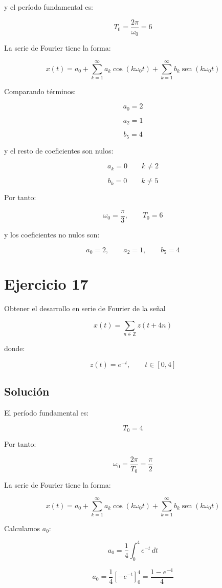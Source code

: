 \documentclass[fleqn]{article}
\DeclareMathOperator{\sen}{sen}
\begin{document}
	y el período fundamental es:

	\[
	T_0
	=
	\frac{2\pi}{\omega_0}
	=
	6
	\]

	La serie de Fourier tiene la forma:

	\[
	x(t)
	=
	a_0
	+
	\sum_{k=1}^{\infty}
	a_k\cos(k\omega_0t)
	+
	\sum_{k=1}^{\infty}
	b_k\sen(k\omega_0t)
	\]

	Comparando términos:

	\[
	a_0=2
	\]

	\[
	a_2=1
	\]

	\[
	b_5=4
	\]

	y el resto de coeficientes son nulos:

	\[
	a_k=0
	\qquad
	k\neq2
	\]

	\[
	b_k=0
	\qquad
	k\neq5
	\]

	Por tanto:

	\[
	\boxed{
	\omega_0=\frac{\pi}{3},
	\qquad
	T_0=6
	}
	\]

	y los coeficientes no nulos son:

	\[
	\boxed{
	a_0=2,\qquad
	a_2=1,\qquad
	b_5=4
	}
	\]

\section{Ejercicio 17}
	Obtener el desarrollo en serie de Fourier de la señal

	\[
	x(t)=\sum_{n\in\mathbb{Z}}z(t+4n)
	\]

	donde:

	\[
	z(t)=e^{-t},
	\qquad
	t\in[0,4]
	\]

	\subsection{Solución}

	El período fundamental es:

	\[
	T_0=4
	\]

	Por tanto:

	\[
	\omega_0
	=
	\frac{2\pi}{T_0}
	=
	\frac{\pi}{2}
	\]

	La serie de Fourier tiene la forma:

	\[
	x(t)
	=
	a_0
	+
	\sum_{k=1}^{\infty}
	a_k\cos(k\omega_0t)
	+
	\sum_{k=1}^{\infty}
	b_k\sen(k\omega_0t)
	\]

	Calculamos $a_0$:

	\[
	a_0
	=
	\frac{1}{4}
	\int_0^4e^{-t}\,dt
	\]

	\[
	a_0
	=
	\frac{1}{4}
	\left[
	-e^{-t}
	\right]_0^4
	=
	\frac{1-e^{-4}}{4}
	\]
\end{document}

